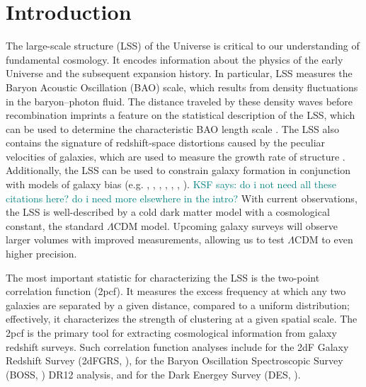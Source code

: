 \documentclass[modern]{aastex62}
\newcommand{\cf}{2pcf\xspace} %
\newcommand{\KSF}[1]{\textcolor{teal}{KSF says: #1}}
\begin{document}
\section{Introduction}

The large-scale structure (LSS) of the Universe is critical to our understanding of fundamental cosmology. 
It encodes information about the physics of the early Universe and the subsequent expansion history.
In particular, LSS measures the Baryon Acoustic Oscillation (BAO) scale, which results from density fluctuations in the baryon--photon fluid.
The distance traveled by these density waves before recombination imprints a feature on the statistical description of the LSS, which can be used to determine the characteristic BAO length scale \citep{EisensteinHu1998}.
The LSS also contains the signature of redshift-space distortions caused by the peculiar velocities of galaxies, which are used to measure the growth rate of structure \citep{Kaiser1987}.
Additionally, the LSS can be used to constrain galaxy formation in conjunction with models of galaxy bias (e.g. \citealt{Hamilton1988}, \citealt{Budavari2003}, \citealt{Li2006}, \citealt{Abbas2006}, \citealt{Zehavi2011}, \citealt{Skibba2014}, \citealt{Durkalec2018}). \KSF{do i not need all these citations here? do i need more elsewhere in the intro?}
With current observations, the LSS is well-described by a cold dark matter model with a cosmological constant, the standard $\Lambda$CDM model.
Upcoming galaxy surveys will observe larger volumes with improved measurements, allowing us to test $\Lambda$CDM to even higher precision.

The most important statistic for characterizing the LSS is the two-point correlation function (\cf).
It measures the excess frequency at which any two galaxies are separated by a given distance, compared to a uniform distribution; effectively, it characterizes the strength of clustering at a given spatial scale.
The \cf is the primary tool for extracting cosmological information from galaxy redshift surveys.
Such correlation function analyses include \cite{Hawkins2003} for the 2dF Galaxy Redshift Survey (2dFGRS, \citealt{Colless2001}), \cite{Alam2016} for the Baryon Oscillation Spectroscopic Survey (BOSS, \citealt{Dawson2013}) DR12 analysis, and \cite{Elvin-Poole2017} for the Dark Energey Survey (DES, \citealt{DES2005}).
\end{document}
